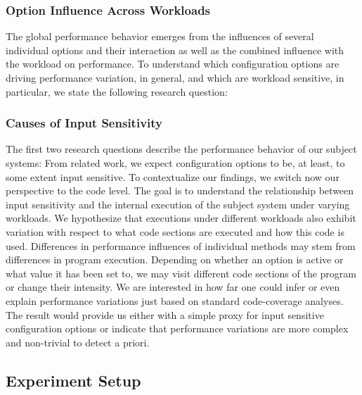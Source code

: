{
\subsubsection{Option Influence Across Workloads}
The global performance behavior emerges from the influences of several individual options and their interaction as well as the combined influence with the workload on performance. To understand which configuration options are driving performance variation, in general, and which are workload sensitive, in particular, we state the following research question:


\subsubsection{Causes of Input Sensitivity}
The first two research questions describe the performance behavior of our subject systems: From related work, we expect configuration options to be, at least, to some extent input sensitive. To contextualize our findings, we switch now our perspective to the code level. The goal is to understand the relationship between input sensitivity and the internal execution of the subject system under varying workloads. We hypothesize that executions under different workloads also exhibit variation with respect to what code sections are executed and how this code is used. 
Differences in performance influences of individual methods may stem from differences in program execution. Depending on whether an option is active or what value it has been set to, we may visit different code sections of the program or change their intensity. We are interested in how far one could infer or even explain performance variations just based on standard code-coverage analyses. The result would provide us either with a simple proxy for input sensitive configuration options or indicate that performance variations are more complex and non-trivial to detect a priori.


\subsection{Experiment Setup}\label{sec:setup}
}
